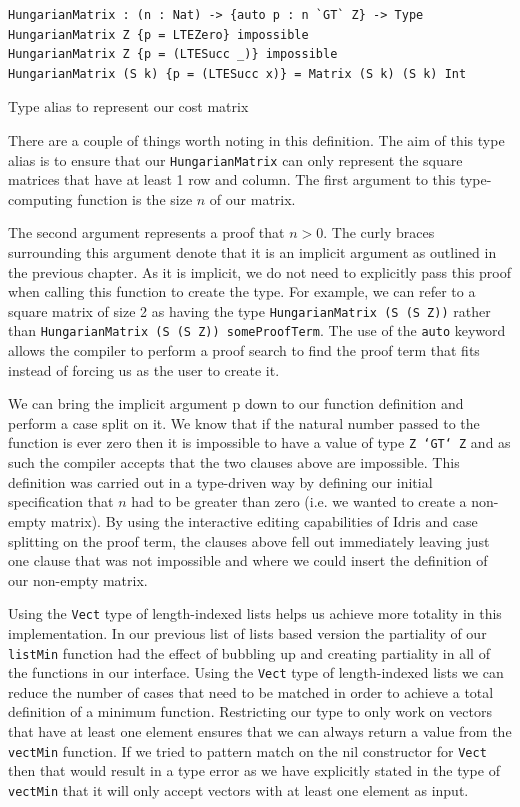 \documentclass[a4paper, notitlepage]{report}
\begin{document}
\begin{listing}[H]
\begin{verbatim}
HungarianMatrix : (n : Nat) -> {auto p : n `GT` Z} -> Type
HungarianMatrix Z {p = LTEZero} impossible
HungarianMatrix Z {p = (LTESucc _)} impossible
HungarianMatrix (S k) {p = (LTESucc x)} = Matrix (S k) (S k) Int
\end{verbatim}
\caption{Type alias to represent our cost matrix}
\end{listing}

There are a couple of things worth noting in this definition. The aim of this
type alias is to ensure that our \texttt{HungarianMatrix} can only represent the square
matrices that have at least 1 row and column. The first argument to this
type-computing function is the size \(n\) of our matrix.

The second argument represents a proof that \(n > 0\). The curly braces
surrounding this argument denote that it is an implicit argument as outlined in
the previous chapter. As it is implicit, we do not need to explicitly pass this
proof when calling this function to create the type. For example, we can refer
to a square matrix of size 2 as having the type \texttt{HungarianMatrix (S (S Z))}
rather than \texttt{HungarianMatrix (S (S Z)) someProofTerm}. The use of the \texttt{auto}
keyword allows the compiler to perform a proof search to find the proof term
that fits instead of forcing us as the user to create it.

We can bring the implicit argument p down to our function definition and perform
a case split on it. We know that if the natural number passed to the function is
ever zero then it is impossible to have a value of type \texttt{Z `GT` Z} and as such the
compiler accepts that the two clauses above are impossible. This definition was
carried out in a type-driven way by defining our initial specification that \(n\)
had to be greater than zero (i.e. we wanted to create a non-empty matrix). By
using the interactive editing capabilities of Idris and case splitting on the
proof term, the clauses above fell out immediately leaving just one clause that
was not impossible and where we could insert the definition of our non-empty
matrix.

Using the \texttt{Vect} type of length-indexed lists helps us achieve more totality in
this implementation. In our previous list of lists based version the partiality
of our \texttt{listMin} function had the effect of bubbling up and creating partiality in
all of the functions in our interface. Using the \texttt{Vect} type of length-indexed
lists we can reduce the number of cases that need to be matched in order to
achieve a total definition of a minimum function. Restricting our type to only
work on vectors that have at least one element ensures that we can always return
a value from the \texttt{vectMin} function. If we tried to pattern match on the nil
constructor for \texttt{Vect} then that would result in a type error as we have
explicitly stated in the type of \texttt{vectMin} that it will only accept vectors with
at least one element as input.
\end{document}
